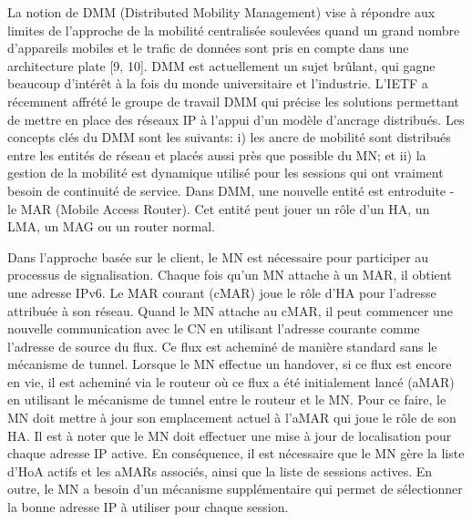La notion de DMM (Distributed Mobility Management) vise à répondre aux limites de l'approche de la mobilité centralisée soulevées quand un grand nombre d'appareils mobiles et le trafic de données sont pris en compte dans une architecture plate [9, 10]. DMM est actuellement un sujet brûlant, qui gagne beaucoup d'intérêt à la fois du monde universitaire et l'industrie. L'IETF a récemment affrété le groupe de travail DMM qui précise les solutions permettant de mettre en place des réseaux IP à l'appui d'un modèle d'ancrage distribués. Les concepts clés du DMM sont les suivants: i) les ancre de mobilité sont distribués entre les entités de réseau et placés aussi près que possible du MN; et ii) la gestion de la mobilité est dynamique utilisé pour les sessions qui ont vraiment besoin de continuité de service. Dans DMM, une nouvelle entité est entroduite - le MAR (Mobile Access Router). Cet entité peut jouer un rôle d'un HA, un LMA, un MAG ou un router normal.

Dans l'approche basée sur le client, le MN est nécessaire pour participer au processus de signalisation. Chaque fois qu'un MN attache à un MAR, il obtient une adresse IPv6. Le MAR courant (cMAR) joue le rôle d'HA pour l'adresse attribuée à son réseau. Quand le MN attache au cMAR, il peut commencer une nouvelle communication avec le CN en utilisant l'adresse courante comme l'adresse de source du flux. Ce flux est acheminé de manière standard sans le mécanisme de tunnel. Lorsque le MN effectue un handover, si ce flux est encore en vie, il est acheminé via le routeur où ce flux a été initialement lancé (aMAR) en utilisant le mécanisme de tunnel entre le routeur et le MN. Pour ce faire, le MN doit mettre à jour son emplacement actuel à l'aMAR qui joue le rôle de son HA. Il est à noter que le MN doit effectuer une mise à jour de localisation pour chaque adresse IP active. En conséquence, il est nécessaire que le MN gère la liste d'HoA actifs et les aMARs associés, ainsi que la liste de sessions actives. En outre, le MN a besoin d'un mécanisme supplémentaire qui permet de sélectionner la bonne adresse IP à utiliser pour chaque session.

